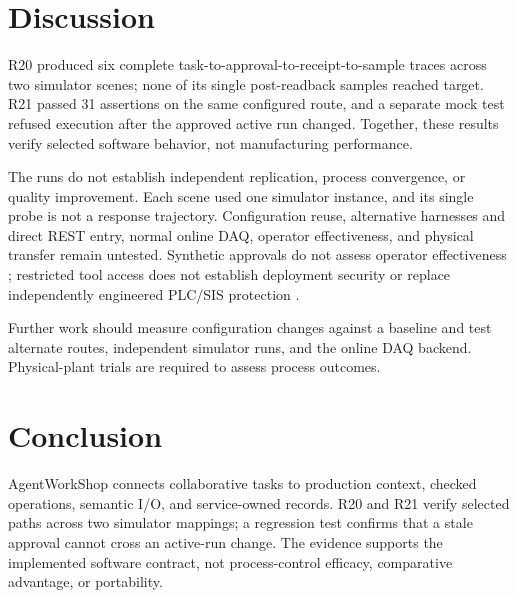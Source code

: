 \section{Discussion}
\label{sec:limits}
R20 produced six complete task-to-approval-to-receipt-to-sample traces across
two simulator scenes; none of its single post-readback samples reached target.
R21 passed 31 assertions on the same configured route, and a separate mock
test refused execution after the approved active run changed. Together, these
results verify selected software behavior, not manufacturing performance.

The runs do not establish independent replication, process convergence, or
quality improvement. Each scene used one simulator instance, and its single
probe is not a response trajectory. Configuration reuse, alternative
harnesses and direct REST entry, normal online DAQ, operator effectiveness,
and physical transfer remain untested. Synthetic approvals do not assess
operator effectiveness \cite{parasuramanmanzey2010complacency,parasuraman2000model,bainbridge1983ironies}; restricted tool access does not establish deployment security \cite{greshake2023injection,liu2024pinjection,iec62443-3-3} or replace independently engineered PLC/SIS protection \cite{iec61511}.

Further work should measure configuration changes against a baseline and test
alternate routes, independent simulator runs, and the online DAQ backend.
Physical-plant trials are required to assess process outcomes.

\section{Conclusion}
\label{sec:conclusion}
AgentWorkShop connects collaborative tasks to production context, checked
operations, semantic I/O, and service-owned records. R20 and R21 verify
selected paths across two simulator mappings; a regression test confirms that
a stale approval cannot cross an active-run change. The evidence supports the
implemented software contract, not process-control efficacy, comparative
advantage, or portability.
